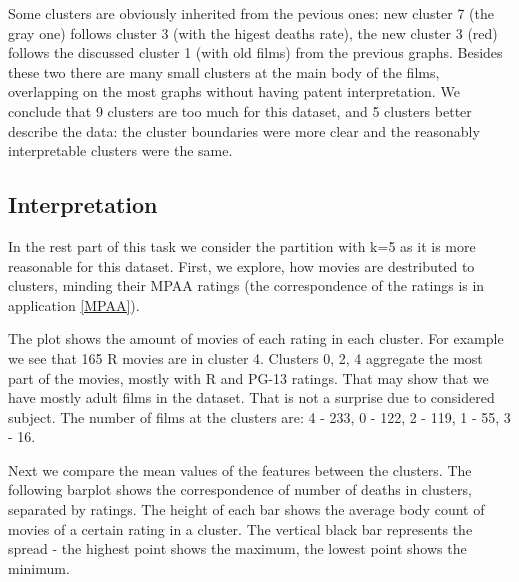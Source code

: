 \documentclass[a4paper,14pt]{article}
\begin{document}
    \begin{center}
\end{center}


Some clusters are obviously inherited from the pevious ones: new cluster 7 (the gray one) follows cluster 3 (with the higest deaths rate), the new cluster 3 (red) follows the discussed cluster 1 (with old films) from the previous graphs. Besides these two there are many small clusters at the main body of the films, overlapping on the most graphs without having patent interpretation. We conclude that 9 clusters are too much for this dataset, and 5 clusters better describe the data: the cluster boundaries were more clear and the reasonably interpretable clusters were the same.

\subsection{Interpretation}

In the rest part of this task we consider the partition with k=5 as it is more reasonable for this dataset. First, we explore, how movies are destributed to clusters, minding their MPAA ratings (the correspondence of the ratings is in application \ref{MPAA}). 

           
\begin{center}
\end{center}

The plot shows the amount of movies of each rating in each cluster. For example we see that 165 R movies are in cluster 4. Clusters 0, 2, 4 aggregate the most part of the movies, mostly with R and PG-13 ratings. That may show that we have mostly adult films in the dataset. That is not a surprise due to considered subject. The number of films at the clusters are: 4 - 233,
0  -  122,
2  -  119,
1  -   55,
3  -   16.

Next we compare the mean values of the features between the clusters. The following barplot shows the correspondence of number of deaths in clusters, separated by ratings. The height of each bar shows the average body count of movies of a certain rating in a cluster. The vertical black bar represents the spread - the highest point shows the maximum, the lowest point shows the minimum.


            
\begin{center}
\end{center}
 
\end{document}
